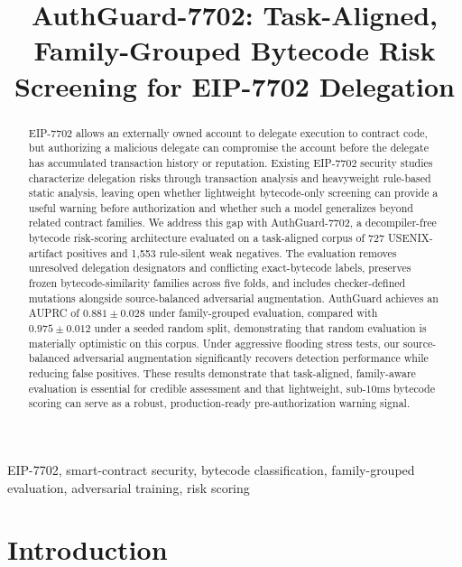 \documentclass[conference]{IEEEtran}
\begin{document}
\title{AuthGuard-7702: Task-Aligned, Family-Grouped Bytecode Risk Screening for EIP-7702 Delegation}

\author{}

\maketitle

\begin{abstract}
EIP-7702 allows an externally owned account to delegate execution to contract code, but authorizing a malicious delegate can compromise the account before the delegate has accumulated transaction history or reputation. Existing EIP-7702 security studies characterize delegation risks through transaction analysis and heavyweight rule-based static analysis, leaving open whether lightweight bytecode-only screening can provide a useful warning before authorization and whether such a model generalizes beyond related contract families. We address this gap with AuthGuard-7702, a decompiler-free bytecode risk-scoring architecture evaluated on a task-aligned corpus of 727 USENIX-artifact positives and 1,553 rule-silent weak negatives. The evaluation removes unresolved delegation designators and conflicting exact-bytecode labels, preserves frozen bytecode-similarity families across five folds, and includes checker-defined mutations alongside source-balanced adversarial augmentation. AuthGuard achieves an AUPRC of $0.881\pm0.028$ under family-grouped evaluation, compared with $0.975\pm0.012$ under a seeded random split, demonstrating that random evaluation is materially optimistic on this corpus. Under aggressive flooding stress tests, our source-balanced adversarial augmentation significantly recovers detection performance while reducing false positives. These results demonstrate that task-aligned, family-aware evaluation is essential for credible assessment and that lightweight, sub-10ms bytecode scoring can serve as a robust, production-ready pre-authorization warning signal.
\end{abstract}

\begin{IEEEkeywords}
EIP-7702, smart-contract security, bytecode classification, family-grouped evaluation, adversarial training, risk scoring
\end{IEEEkeywords}

\section{Introduction}
\label{sec:introduction}
\end{document}
